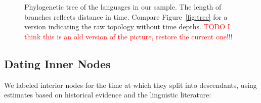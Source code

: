 \documentclass[11pt,a4paper]{article}
\begin{document}
\begin{figure}
    \centering
	\caption{Phylogenetic tree of the languages in our sample. The length of branches reflects distance in time. Compare Figure~\ref{fig:tree} for a version indicating the raw topology without time depths. \textcolor{red}{TODO I think this is an old version of the picture, restore the current one!!!}}
    \label{fig:tree-times}
\end{figure}




\subsection{Dating Inner Nodes}
We labeled interior nodes for the time at which they split into descendants, using estimates based on historical evidence and the linguistic literature:


\end{document}
